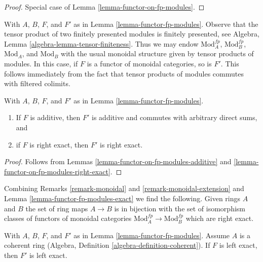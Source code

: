 \begin{proof}
Special case of Lemma \ref{lemma-functor-on-fp-modules}.
\end{proof}

\begin{remark}
\label{remark-monoidal-extension}
With $A$, $B$, $F$, and $F'$ as in Lemma \ref{lemma-functor-fp-modules}.
Observe that the tensor product of two finitely presented modules is
finitely presented, see Algebra, Lemma \ref{algebra-lemma-tensor-finiteness}.
Thus we may endow $\text{Mod}^{fp}_A$, $\text{Mod}^{fp}_B$,
$\text{Mod}_A$, and $\text{Mod}_B$ with the usual monoidal structure
given by tensor products of modules. In this case, if $F$ is
a functor of monoidal categories, so is $F'$. This follows immediately
from the fact that tensor products of modules commutes with filtered
colimits.
\end{remark}

\begin{lemma}
\label{lemma-functor-fp-modules-exact}
With $A$, $B$, $F$, and $F'$ as in Lemma \ref{lemma-functor-fp-modules}.
\begin{enumerate}
\item If $F$ is additive, then $F'$ is additive and
commutes with arbitrary direct sums, and
\item if $F$ is right exact, then $F'$ is right exact.
\end{enumerate}
\end{lemma}

\begin{proof}
Follows from Lemmas \ref{lemma-functor-on-fp-modules-additive} and
\ref{lemma-functor-on-fp-modules-right-exact}.
\end{proof}

\begin{remark}
\label{remark-monoidal-extension-exact}
Combining Remarks \ref{remark-monoidal} and \ref{remark-monoidal-extension}
and Lemma \ref{lemma-functor-fp-modules-exact}
we find the following. Given rings $A$ and $B$ the set of ring maps $A \to B$
is in bijection with the set of isomorphism classes
of functors of monoidal categories $\text{Mod}^{fp}_A \to \text{Mod}^{fp}_B$
which are right exact.
\end{remark}

\begin{lemma}
\label{lemma-functor-fp-modules-left-exact}
With $A$, $B$, $F$, and $F'$ as in Lemma \ref{lemma-functor-fp-modules}.
Assume $A$ is a coherent ring
(Algebra, Definition \ref{algebra-definition-coherent}).
If $F$ is left exact, then $F'$ is left exact.
\end{lemma}

